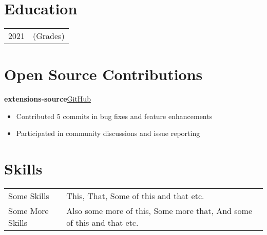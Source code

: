 \documentclass[a4paper,12pt]{article}
\newenvironment{itemList}[2]
    {
    \noindent\hspace{1em}\textbf{#1}\hfill#2\\[3.75pt]
    \begin{minipage}[t]{\linewidth}
    \begin{itemize}[nosep,after=\strut, leftmargin=2em, itemsep=3pt,label={}]
    }
    {
    \end{itemize}
    \end{minipage}    
    }
\begin{document}
\section{Education}
\begin{tabularx}{\linewidth}{@{}l X@{}}
    2021 & \hfill  (Grades) \\
\end{tabularx}

\section{Open Source Contributions}
\begin{itemList}{extensions-source}{\href{https://github.com/keiyoushi/extensions-source}{GitHub}}
    \item Contributed 5 commits in bug fixes and feature enhancements
    \item Participated in community discussions and issue reporting
\end{itemList}

\section{Skills}
\begin{tabularx}{\linewidth}{@{}l X@{}}
    Some Skills      & \normalsize{This, That, Some of this and that etc.}                                 \\
    Some More Skills & \normalsize{Also some more of this, Some more that, And some of this and that etc.} \\
\end{tabularx}

\vfill
{}
\end{document}
